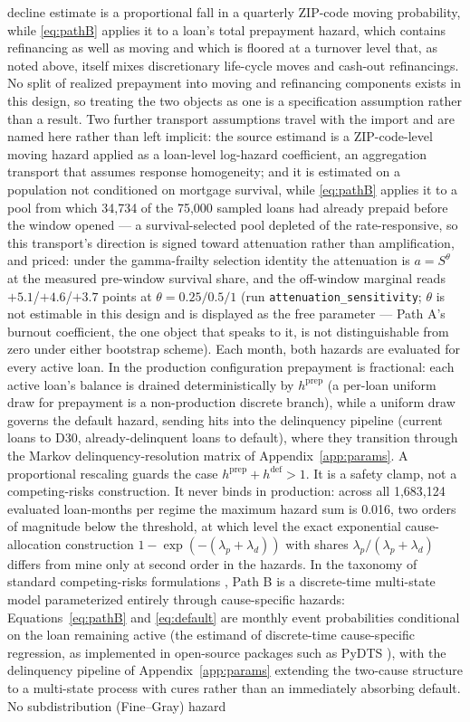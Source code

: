\documentclass[12pt]{article}
\begin{document}
decline \citet{liebersohn2024} estimate is a proportional fall in a quarterly ZIP-code moving probability, while \eqref{eq:pathB} applies it to a loan's total prepayment hazard, which contains refinancing as well as moving and which is floored at a turnover level that, as noted above, itself mixes discretionary life-cycle moves and cash-out refinancings. No split of realized prepayment into moving and refinancing components exists in this design, so treating the two objects as one is a specification assumption rather than a result. Two further transport assumptions travel with the import and are named here rather than left implicit: the source estimand is a ZIP-code-level moving hazard applied as a loan-level log-hazard coefficient, an aggregation transport that assumes response homogeneity; and it is estimated on a population not conditioned on mortgage survival, while \eqref{eq:pathB} applies it to a pool from which 34,734 of the 75,000 sampled loans had already prepaid before the window opened --- a survival-selected pool depleted of the rate-responsive, so this transport's direction is signed toward attenuation rather than amplification, and priced: under the gamma-frailty selection identity the attenuation is $a = S^{\theta}$ at the measured pre-window survival share, and the off-window marginal reads $+5.1$/$+4.6$/$+3.7$ points at $\theta = 0.25/0.5/1$ (run \texttt{attenuation\_sensitivity}; $\theta$ is not estimable in this design and is displayed as the free parameter --- Path A's burnout coefficient, the one object that speaks to it, is not distinguishable from zero under either bootstrap scheme). Each month, both hazards are evaluated for every active loan. In the production configuration prepayment is fractional: each active loan's balance is drained deterministically by $h^{\mathrm{prep}}$ (a per-loan uniform draw for prepayment is a non-production discrete branch), while a uniform draw governs the default hazard, sending hits into the delinquency pipeline (current loans to D30, already-delinquent loans to default), where they transition through the Markov delinquency-resolution matrix of Appendix~\ref{app:params}. A proportional rescaling guards the case $h^{\mathrm{prep}} + h^{\mathrm{def}} > 1$. It is a safety clamp, not a competing-risks construction. It never binds in production: across all 1,683,124 evaluated loan-months per regime the maximum hazard sum is 0.016, two orders of magnitude below the threshold, at which level the exact exponential cause-allocation construction $1-\exp(-(\lambda_p+\lambda_d))$ with shares $\lambda_p/(\lambda_p+\lambda_d)$ differs from mine only at second order in the hazards. In the taxonomy of standard competing-risks formulations \citep{putter2007}, Path B is a discrete-time multi-state model parameterized entirely through cause-specific hazards: Equations~\eqref{eq:pathB} and \eqref{eq:default} are monthly event probabilities conditional on the loan remaining active (the estimand of discrete-time cause-specific regression, as implemented in open-source packages such as PyDTS \citep{meir2025}), with the delinquency pipeline of Appendix~\ref{app:params} extending the two-cause structure to a multi-state process with cures rather than an immediately absorbing default. No subdistribution (Fine--Gray) hazard \citep{fine1999} 
\end{document}
